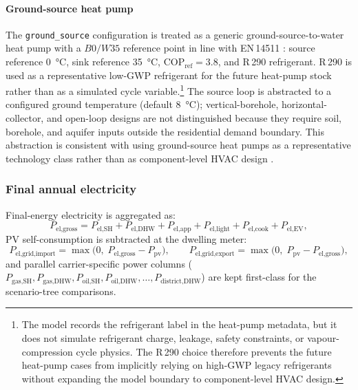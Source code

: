 \paragraph{Ground-source heat pump}
The \texttt{ground\_source} configuration is treated as a generic ground-source-to-water heat pump with a $B0/W35$ reference point in line with EN\,14511 \cite{EN14511_2018}: source reference \SI{0}{\celsius}, sink reference \SI{35}{\celsius}, $\mathrm{COP}_{\mathrm{ref}}=3.8$, and R\,290 refrigerant. R\,290 is used as a representative low-GWP refrigerant for the future heat-pump stock rather than as a simulated cycle variable.\footnote{The model records the refrigerant label in the heat-pump metadata, but it does not simulate refrigerant charge, leakage, safety constraints, or vapour-compression cycle physics. The R\,290 choice therefore prevents the future heat-pump cases from implicitly relying on high-GWP legacy refrigerants without expanding the model boundary to component-level HVAC design.} The source loop is abstracted to a configured ground temperature (default \SI{8}{\celsius}); vertical-borehole, horizontal-collector, and open-loop designs are not distinguished because they require soil, borehole, and aquifer inputs outside the residential demand boundary. This abstraction is consistent with using ground-source heat pumps as a representative technology class rather than as component-level HVAC design \cite{JRC2022HeatPumpBelgium}.

\subsubsection*{Final annual electricity}
Final-energy electricity is aggregated as:
\begin{equation}
  P_{\text{el,gross}} = P_{\text{el,SH}} + P_{\text{el,DHW}}
  + P_{\text{el,app}} + P_{\text{el,light}}
  + P_{\text{el,cook}} + P_{\text{el,EV}},
\end{equation}
PV self-consumption is subtracted at the dwelling meter:
\begin{equation}
  P_{\text{el,grid,import}}
    = \max\!\bigl(0,\; P_{\text{el,gross}} - P_{\text{pv}}\bigr),
  \qquad
  P_{\text{el,grid,export}}
    = \max\!\bigl(0,\; P_{\text{pv}} - P_{\text{el,gross}}\bigr),
\end{equation}
and parallel carrier-specific power columns ($P_{\text{gas,SH}}, P_{\text{gas,DHW}}, P_{\text{oil,SH}}, P_{\text{oil,DHW}}, \ldots, P_{\text{district,DHW}}$) are kept first-class for the scenario-tree comparisons.

